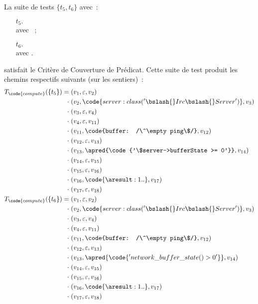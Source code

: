 \begin{example}

La suite de tests $\{t_5, t_6\}$ avec~:
%
\begin{itemize}

\item[$t_5.$]  \\
avec ~;

\item[$t_6.$]  \\
avec .

\end{itemize}
%
satisfait le Critère de Couverture de Prédicat. Cette suite de test produit les
chemins respectifs suivants (sur les sentiers)~:
%
\begin{align*}
%
T_\code{compute}(\{t_5\}) =\;
          & (v_1, \varepsilon, v_2) \\
  \cdot\; & (v_2, \code{server: class('\bslash{}Irc\bslash{}Server')}, v_3) \\
  \cdot\; & (v_3, \varepsilon, v_4) \\
  \cdot\; & (v_4, \varepsilon, v_{11}) \\
  \cdot\; & (v_{11}, \code{buffer: /\^\empty ping\$/}, v_{12}) \\
  \cdot\; & (v_{12}, \varepsilon, v_{13}) \\
  \cdot\; & (v_{13}, \apred{\code{'\$server->bufferState >= 0'}}, v_{14}) \\
  \cdot\; & (v_{14}, \varepsilon, v_{15}) \\
  \cdot\; & (v_{15}, \varepsilon, v_{16}) \\
  \cdot\; & (v_{16}, \code{\aresult: 1..}, v_{17}) \\
  \cdot\; & (v_{17}, \varepsilon, v_{18}) \\
%
T_\code{compute}(\{t_6\}) =\;
          & (v_1, \varepsilon, v_2) \\
  \cdot\; & (v_2, \code{server: class('\bslash{}Irc\bslash{}Server')}, v_3) \\
  \cdot\; & (v_3, \varepsilon, v_4) \\
  \cdot\; & (v_4, \varepsilon, v_{11}) \\
  \cdot\; & (v_{11}, \code{buffer: /\^\empty ping\$/}, v_{12}) \\
  \cdot\; & (v_{12}, \varepsilon, v_{13}) \\
  \cdot\; & (v_{13}, \apred{\code{'network\_buffer\_state() > 0'}}, v_{14}) \\
  \cdot\; & (v_{14}, \varepsilon, v_{15}) \\
  \cdot\; & (v_{15}, \varepsilon, v_{16}) \\
  \cdot\; & (v_{16}, \code{\aresult: 1..}, v_{17}) \\
  \cdot\; & (v_{17}, \varepsilon, v_{18}) \\
%
\end{align*}

\end{example}

